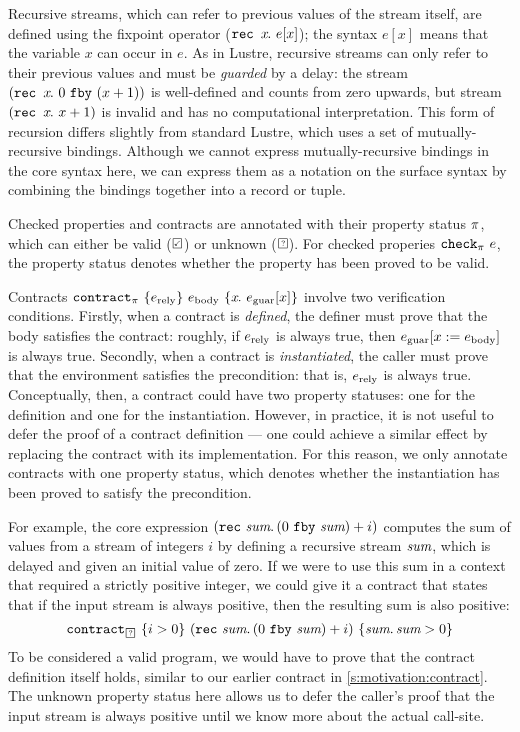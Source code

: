 Recursive streams, which can refer to previous values of the stream itself, are defined using the fixpoint operator ($\texttt{rec~} x\hspace{-0.1em}.~e[x]$); the syntax $e[x]$ means that the variable $x$ can occur in $e$.
As in Lustre, recursive streams can only refer to their previous values and must be \emph{guarded} by a delay: the stream $(\texttt{rec~} x\hspace{-0.1em}.~0~\texttt{fby}~(x + 1))$ is well-defined and counts from zero upwards, but stream $(\texttt{rec~} x\hspace{-0.1em}.~x + 1)$ is invalid and has no computational interpretation.
This form of recursion differs slightly from standard Lustre, which uses a set of mutually-recursive bindings.
Although we cannot express mutually-recursive bindings in the core syntax here, we can express them as a notation on the surface syntax by combining the bindings together into a record or tuple.

Checked properties and contracts are annotated with their property status $\pi$, which can either be valid ($\PSValid$) or unknown ($\PSUnknown$).
For checked properies $\texttt{check}_{\pi}~e$, the property status denotes whether the property has been proved to be valid.

Contracts $\texttt{contract}_{\pi}~\{e_{\text{rely}}\}~e_{\text{body}}~\{x\hspace{-0.1em}.~e_{\text{guar}}[x]\}$ involve two verification conditions.
Firstly, when a contract is \emph{defined}, the definer must prove that the body satisfies the contract: roughly, if $e_{\text{rely}}$ is always true, then $e_{\text{guar}}[x := e_{\text{body}}]$ is always true.
Secondly, when a contract is \emph{instantiated}, the caller must prove that the environment satisfies the precondition: that is, $e_{\text{rely}}$ is always true.
Conceptually, then, a contract could have two property statuses: one for the definition and one for the instantiation.
However, in practice, it is not useful to defer the proof of a contract definition --- one could achieve a similar effect by replacing the contract with its implementation.
For this reason, we only annotate contracts with one property status, which denotes whether the instantiation has been proved to satisfy the precondition.

For example, the core expression $(\texttt{rec}~\textit{sum}.\, (0~\texttt{fby}~\textit{sum}) + i)$ computes the sum of values from a stream of integers $i$ by defining a recursive stream $\textit{sum}$, which is delayed and given an initial value of zero.
If we were to use this sum in a context that required a strictly positive integer, we could give it a contract that states that if the input stream is always positive, then the resulting sum is also positive:
$$
\sumcontract
$$
To be considered a valid program, we would have to prove that the contract definition itself holds, similar to our earlier contract in \autoref{s:motivation:contract}.
The unknown property status here allows us to defer the caller's proof that the input stream is always positive until we know more about the actual call-site.


